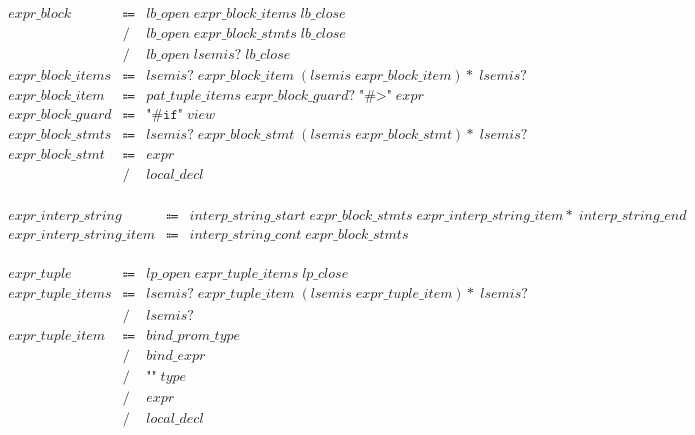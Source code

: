 \begin{align*}
    \begin{array}{rcll}
        \mathit{expr\_block}
        &\Coloneq &\mathit{lb\_open}\; \mathit{expr\_block\_items}\; \mathit{lb\_close} \\
        &\mathrel{/} &\mathit{lb\_open}\; \mathit{expr\_block\_stmts}\; \mathit{lb\_close} \\
        &\mathrel{/} &\mathit{lb\_open}\; \mathit{lsemis}{?}\; \mathit{lb\_close} \\
        \mathit{expr\_block\_items}
        &\Coloneq &\mathit{lsemis}{?}\; \mathit{expr\_block\_item}\; (\mathit{lsemis}\; \mathit{expr\_block\_item}){*}\; \mathit{lsemis}{?} \\
        \mathit{expr\_block\_item}
        &\Coloneq &\mathit{pat\_tuple\_items}\; \mathit{expr\_block\_guard}{?}\; \texttt{"\#>"}\; \mathit{expr} \\
        \mathit{expr\_block\_guard}
        &\Coloneq &\texttt{"\#if"}\; \mathit{view} \\
        \mathit{expr\_block\_stmts}
        &\Coloneq &\mathit{lsemis}{?}\; \mathit{expr\_block\_stmt}\; (\mathit{lsemis}\; \mathit{expr\_block\_stmt}){*}\; \mathit{lsemis}{?} \\
        \mathit{expr\_block\_stmt}
        &\Coloneq &\mathit{expr} \\
        &\mathrel{/} &\mathit{local\_decl}
    \end{array}
\end{align*}

\begin{align*}
    \begin{array}{rcll}
        \mathit{expr\_interp\_string}
        &\Coloneq &\mathit{interp\_string\_start}\; \mathit{expr\_block\_stmts}\; \mathit{expr\_interp\_string\_item}{*}\; \mathit{interp\_string\_end} \\
        \mathit{expr\_interp\_string\_item}
        &\Coloneq &\mathit{interp\_string\_cont}\; \mathit{expr\_block\_stmts}
    \end{array}
\end{align*}

\begin{align*}
    \begin{array}{rcll}
        \mathit{expr\_tuple}
        &\Coloneq &\mathit{lp\_open}\; \mathit{expr\_tuple\_items}\; \mathit{lp\_close} \\
        \mathit{expr\_tuple\_items}
        &\Coloneq &\mathit{lsemis}{?}\; \mathit{expr\_tuple\_item}\; (\mathit{lsemis}\; \mathit{expr\_tuple\_item}){*}\; \mathit{lsemis}{?} \\
        &\mathrel{/} &\mathit{lsemis}{?} \\
        \mathit{expr\_tuple\_item}
        &\Coloneq &\mathit{bind\_prom\_type} \\
        &\mathrel{/} &\mathit{bind\_expr} \\
        &\mathrel{/} &\texttt{"\^{}"}\; \mathit{type} \\
        &\mathrel{/} &\mathit{expr} \\
        &\mathrel{/} &\mathit{local\_decl}
    \end{array}
\end{align*}

